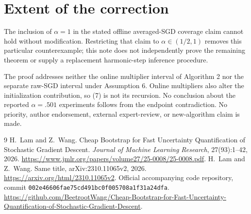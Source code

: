 \documentclass[11pt]{article}
\begin{document}
\section{Extent of the correction}

The inclusion of $\alpha=1$ in the stated offline averaged-SGD coverage
claim cannot hold without modification. Restricting that claim to
$\alpha\in(1/2,1)$ removes this particular counterexample; this note does
not independently prove the remaining theorem or supply a replacement
harmonic-step inference procedure.

The proof addresses neither the online multiplier interval of Algorithm 2
nor the separate raw-SGD interval under Assumption 6. Online multipliers
also alter the initialization contribution, so (7) is not its recursion.
No conclusion about the reported $\alpha=.501$ experiments follows from
the endpoint contradiction. No priority, author endorsement, external
expert-review, or new-algorithm claim is made.

\begin{thebibliography}{9}
H.~Lam and Z.~Wang.
Cheap Bootstrap for Fast Uncertainty Quantification of Stochastic
Gradient Descent.
\emph{Journal of Machine Learning Research}, 27(93):1--42, 2026.
\url{https://www.jmlr.org/papers/volume27/25-0008/25-0008.pdf}.
H.~Lam and Z.~Wang.
Same title, arXiv:2310.11065v2, 2026.
\url{https://arxiv.org/html/2310.11065v2}.
Official accompanying code repository, commit
\texttt{002e46606fae75cd491bc0f005708a1f31a24dfa}.
\url{https://github.com/BeetrootWang/Cheap-Bootstrap-for-Fast-Uncertainty-Quantification-of-Stochastic-Gradient-Descent}.
\end{thebibliography}
\end{document}
